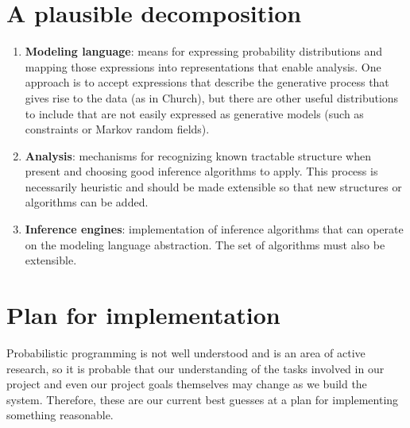 \documentclass{article}
\begin{document}
    \section{A plausible decomposition}
    \begin{enumerate}
        \item \textbf{Modeling language}: means for expressing probability
            distributions and mapping those expressions into representations
            that enable analysis. One approach is to accept expressions that
            describe the generative process that gives rise to the data (as in
            Church), but there are other useful distributions to include that
            are not easily expressed as generative models (such as constraints
            or Markov random fields).
        \item \textbf{Analysis}: mechanisms for recognizing known tractable
            structure when present and choosing good inference algorithms to
            apply. This process is necessarily heuristic and should be made
            extensible so that new structures or algorithms can be added.
        \item \textbf{Inference engines}: implementation of inference
            algorithms that can operate on the modeling language abstraction.
            The set of algorithms must also be extensible.
    \end{enumerate}

    \section{Plan for implementation}
    Probabilistic programming is not well understood and is an area of active
    research, so it is probable that our understanding of the tasks involved in
    our project and even our project goals themselves may change as we build
    the system. Therefore, these are our current best guesses at a plan for
    implementing something reasonable.
\end{document}
